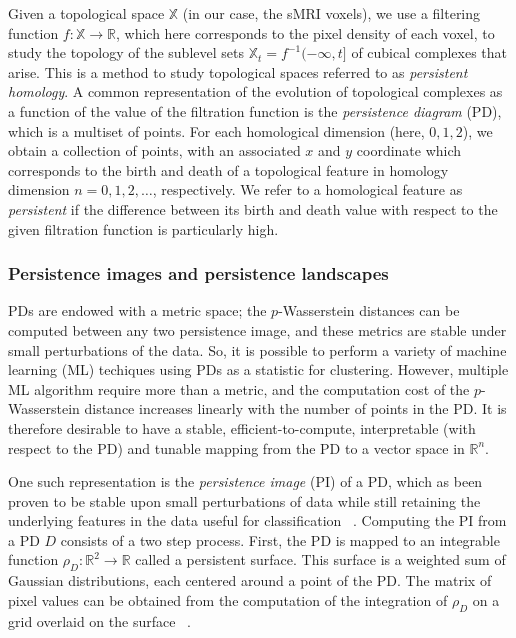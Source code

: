 \documentclass{article}
\begin{document}
Given a topological space $\mathbb{X}$ (in our case, the sMRI voxels), we use a filtering function
$f:\mathbb{X}\to\mathbb{R}$, which here corresponds to the pixel density of each voxel, to study the
topology of the sublevel sets $\mathbb{X}_t=f^{-1}(-\infty, t]$ of cubical complexes that arise.
  This is a method to study topological spaces referred to as \emph{persistent homology}. A common
  representation of the evolution of topological complexes as a function of the value of the
  filtration function is the \emph{persistence diagram} (PD), which is a multiset of points. For
  each homological dimension (here, $0,1,2$), we obtain a collection of points, with an associated
  $x$ and $y$ coordinate which corresponds to the birth and death of a topological feature in
  homology dimension $n=0,1,2,\ldots$, respectively. We refer to a homological feature as
  \emph{persistent} if the difference between its birth and death value with respect to the given
  filtration function is particularly high.


\subsubsection{Persistence images and persistence landscapes}\label{sec:theory_persistence_landscape_persistence_image}

PDs are endowed with a metric space; the $p$-Wasserstein distances can be computed between any two
persistence image, and these metrics are stable under small perturbations of the data. So, it is
possible to perform a variety of machine learning (ML) techiques using PDs as a statistic for
clustering. However, multiple ML algorithm require more than a metric, and the computation cost of
the $p$-Wasserstein distance increases linearly with the number of points in the PD. It is therefore
desirable to have a stable, efficient-to-compute, interpretable (with respect to the PD) and tunable
mapping from the PD to a vector space in $\mathbb{R}^n$.

One such representation is the \emph{persistence image} (PI) of a PD, which as been proven to be
stable upon small perturbations of data while still retaining the underlying features in the data
useful for classification ~\citep{adams2017persistence}. Computing the PI from a PD $D$ consists of
a two step process. First, the PD is mapped to an integrable function $\rho_D : \mathbb{R}^2\to
\mathbb{R}$ called a persistent surface. This surface is a weighted sum of Gaussian distributions,
each centered around a point of the PD. The matrix of pixel values can be obtained from the
computation of the integration of $\rho_D$ on a grid overlaid on the surface
~\citep{adams2017persistence}.
\end{document}
